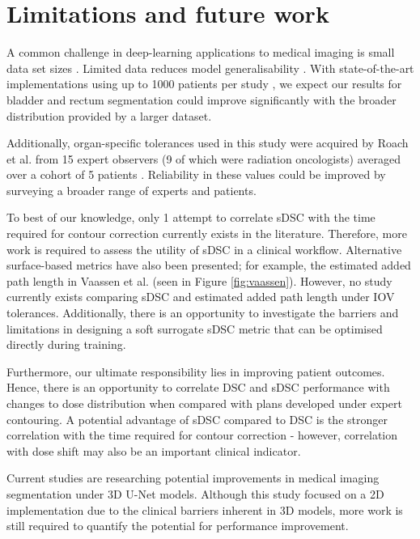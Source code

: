 \section{Limitations and future work}

A common challenge in deep-learning applications to medical imaging is small data set sizes \cite{Ronneberger_2015}. Limited data reduces model generalisability \cite{Shen2017}. With state-of-the-art implementations using up to 1000 patients per study \cite{Nikolov_2018}, we expect our results for bladder and rectum segmentation could improve significantly with the broader distribution provided by a larger dataset.

Additionally, organ-specific tolerances used in this study were acquired by Roach et al. from 15 expert observers (9 of which were radiation oncologists) averaged over a cohort of 5 patients \cite{Roach_2019}. Reliability in these values could be improved by surveying a broader range of experts and patients.

To best of our knowledge, only 1 attempt to correlate sDSC with the time required for contour correction currently exists in the literature. Therefore, more work is required to assess the utility of sDSC in a clinical workflow. Alternative surface-based metrics have also been presented; for example, the estimated added path length in Vaassen et al. (seen in Figure \ref{fig:vaassen}). However, no study currently exists comparing sDSC and estimated added path length under IOV tolerances. Additionally, there is an opportunity to investigate the barriers and limitations in designing a soft surrogate sDSC metric that can be optimised directly during training.

Furthermore, our ultimate responsibility lies in improving patient outcomes. Hence, there is an opportunity to correlate DSC and sDSC performance with changes to dose distribution when compared with plans developed under expert contouring. A potential advantage of sDSC compared to DSC is the stronger correlation with the time required for contour correction - however, correlation with dose shift may also be an important clinical indicator.

Current studies are researching potential improvements in medical imaging segmentation under 3D U-Net models. Although this study focused on a 2D implementation due to the clinical barriers inherent in 3D models, more work is still required to quantify the potential for performance improvement. 

